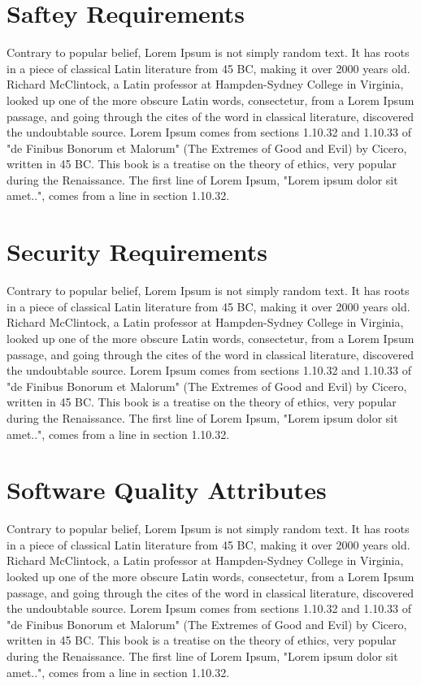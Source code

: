 \documentclass{scrreprt}
\begin{document}
    \section{Saftey Requirements}
    Contrary to popular belief, Lorem Ipsum is not simply random text. It has roots in a piece of classical Latin literature from 45 BC, making it over 2000 years old. Richard McClintock, a Latin professor at Hampden-Sydney College in Virginia, looked up one of the more obscure Latin words, consectetur, from a Lorem Ipsum passage, and going through the cites of the word in classical literature, discovered the undoubtable source. Lorem Ipsum comes from sections 1.10.32 and 1.10.33 of "de Finibus Bonorum et Malorum" (The Extremes of Good and Evil) by Cicero, written in 45 BC. This book is a treatise on the theory of ethics, very popular during the Renaissance. The first line of Lorem Ipsum, "Lorem ipsum dolor sit amet..", comes from a line in section 1.10.32. 
    \section{Security Requirements}
    Contrary to popular belief, Lorem Ipsum is not simply random text. It has roots in a piece of classical Latin literature from 45 BC, making it over 2000 years old. Richard McClintock, a Latin professor at Hampden-Sydney College in Virginia, looked up one of the more obscure Latin words, consectetur, from a Lorem Ipsum passage, and going through the cites of the word in classical literature, discovered the undoubtable source. Lorem Ipsum comes from sections 1.10.32 and 1.10.33 of "de Finibus Bonorum et Malorum" (The Extremes of Good and Evil) by Cicero, written in 45 BC. This book is a treatise on the theory of ethics, very popular during the Renaissance. The first line of Lorem Ipsum, "Lorem ipsum dolor sit amet..", comes from a line in section 1.10.32. 
    \section{Software Quality Attributes}
    Contrary to popular belief, Lorem Ipsum is not simply random text. It has roots in a piece of classical Latin literature from 45 BC, making it over 2000 years old. Richard McClintock, a Latin professor at Hampden-Sydney College in Virginia, looked up one of the more obscure Latin words, consectetur, from a Lorem Ipsum passage, and going through the cites of the word in classical literature, discovered the undoubtable source. Lorem Ipsum comes from sections 1.10.32 and 1.10.33 of "de Finibus Bonorum et Malorum" (The Extremes of Good and Evil) by Cicero, written in 45 BC. This book is a treatise on the theory of ethics, very popular during the Renaissance. The first line of Lorem Ipsum, "Lorem ipsum dolor sit amet..", comes from a line in section 1.10.32.  
\end{document}
